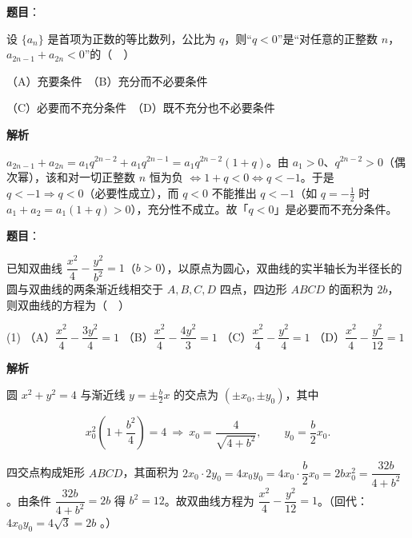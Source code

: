 \begin{answer}

\textbf{题目}：

设 \(\{a_{n}\}\) 是首项为正数的等比数列，公比为 \(q\)，则“\(q<0\)”是“对任意的正整数 \(n\)，\(a_{2n-1}+a_{2n}<0\)”的（　）

（A）充要条件　（B）充分而不必要条件

（C）必要而不充分条件　（D）既不充分也不必要条件

\textbf{解析}

\(a_{2n-1}+a_{2n}=a_{1}q^{2n-2}+a_{1}q^{2n-1}=a_{1}q^{2n-2}(1+q)\)。由 \(a_{1}>0\)、\(q^{2n-2}>0\)（偶次幂），该和对一切正整数 \(n\) 恒为负 \(\iff 1+q<0\iff q<-1\)。于是 \(q<-1\Rightarrow q<0\)（必要性成立），而 \(q<0\) 不能推出 \(q<-1\)（如 \(q=-\frac{1}{2}\) 时 \(a_{1}+a_{2}=a_{1}(1+q)>0\)），充分性不成立。故「\(q<0\)」是必要而不充分条件。


\end{answer}
\begin{answer}

\textbf{题目}：

已知双曲线 \(\dfrac{x^{2}}{4}-\dfrac{y^{2}}{b^{2}}=1\)（\(b>0\)），以原点为圆心，双曲线的实半轴长为半径长的圆与双曲线的两条渐近线相交于 \(A,B,C,D\) 四点，四边形 \(ABCD\) 的面积为 \(2b\)，则双曲线的方程为（　）

\begin{gkopts}(1)
\task （A）\(\dfrac{x^{2}}{4}-\dfrac{3y^{2}}{4}=1\)
\task （B）\(\dfrac{x^{2}}{4}-\dfrac{4y^{2}}{3}=1\)
\task （C）\(\dfrac{x^{2}}{4}-\dfrac{y^{2}}{4}=1\)
\task （D）\(\dfrac{x^{2}}{4}-\dfrac{y^{2}}{12}=1\)
\end{gkopts}

\textbf{解析}

圆 \(x^{2}+y^{2}=4\) 与渐近线 \(y=\pm\frac{b}{2}x\) 的交点为 \((\pm x_{0},\pm y_{0})\)，其中

\nopagebreak[4]
\[
x_{0}^{2}\left(1+\frac{b^{2}}{4}\right)=4\ \Longrightarrow\ x_{0}=\frac{4}{\sqrt{4+b^{2}}},\qquad y_{0}=\frac{b}{2}x_{0}.
\]

四交点构成矩形 \(ABCD\)，其面积为 \(2x_{0}\cdot2y_{0}=4x_{0}y_{0}=4x_{0}\cdot\dfrac{b}{2}x_{0}=2bx_{0}^{2}=\dfrac{32b}{4+b^{2}}\)。由条件 \(\dfrac{32b}{4+b^{2}}=2b\) 得 \(b^{2}=12\)。故双曲线方程为 \(\dfrac{x^{2}}{4}-\dfrac{y^{2}}{12}=1\)。（回代：\(4x_{0}y_{0}=4\sqrt{3}=2b\) 。）


\end{answer}
